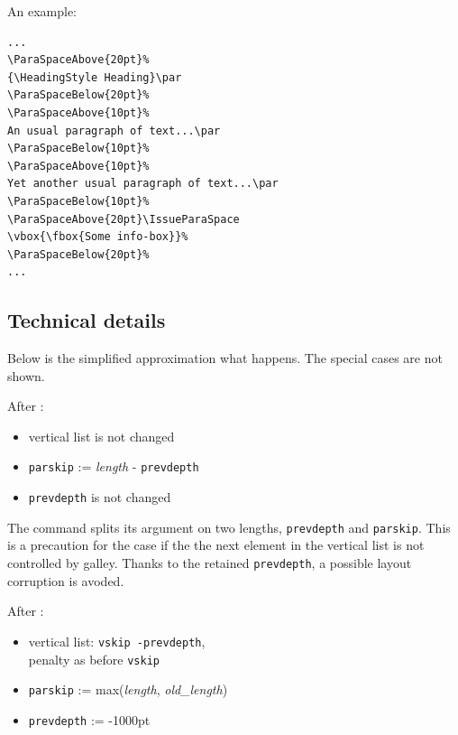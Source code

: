 \documentclass[]{ltugboat}
\begin{document}
An example:

\begin{verbatim}
...
\ParaSpaceAbove{20pt}%
{\HeadingStyle Heading}\par
\ParaSpaceBelow{20pt}%
\ParaSpaceAbove{10pt}%
An usual paragraph of text...\par
\ParaSpaceBelow{10pt}%
\ParaSpaceAbove{10pt}%
Yet another usual paragraph of text...\par
\ParaSpaceBelow{10pt}%
\ParaSpaceAbove{20pt}\IssueParaSpace
\vbox{\fbox{Some info-box}}%
\ParaSpaceBelow{20pt}%
...
\end{verbatim}

\subsection{Technical details}

Below is the simplified approximation what happens. The special cases are not shown.

\medskip

After :

\begin{itemize}
\item vertical list is not changed
\item \verb|parskip| := \textit{length} - \verb|prevdepth|
\item \verb|prevdepth| is not changed
\end{itemize}

The command  splits its argument on two lengths, \verb|prevdepth| and \verb|parskip|. This is a precaution for the case if the the next element in the vertical list is not controlled by galley. Thanks to the retained \verb|prevdepth|, a possible layout corruption is avoded.

\medskip

After :

\begin{itemize}
\item vertical list: \verb|vskip -prevdepth|,\\penalty as before \verb|vskip|
\item \verb|parskip| := max(\textit{length}, \textit{old\_length})
\item \verb|prevdepth| := -1000pt
\end{itemize}
\end{document}
